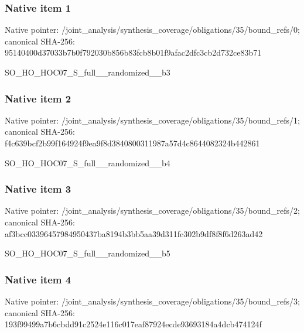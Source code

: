 \documentclass[10pt,a4paper]{article}
\begin{document}
\subsubsection{Native item 1}
Native pointer: /joint\_\allowbreak{}analysis/synthesis\_\allowbreak{}coverage/obligations/35/bound\_\allowbreak{}refs/0; canonical SHA-256: 95140400d37033b7b0f792030b856b83fcb8b01f9afac2dfc3cb2d732ce83b71

\begingroup\raggedright\sloppy SO\_\allowbreak{}HO\_\allowbreak{}HOC07\_\allowbreak{}S\_\allowbreak{}full\_\allowbreak{}\_\allowbreak{}randomized\_\allowbreak{}\_\allowbreak{}b3\par\endgroup

\subsubsection{Native item 2}
Native pointer: /joint\_\allowbreak{}analysis/synthesis\_\allowbreak{}coverage/obligations/35/bound\_\allowbreak{}refs/1; canonical SHA-256: f4c639bcf2b99f164924f9ea9f8d3840800311987a57d4c8644082324b442861

\begingroup\raggedright\sloppy SO\_\allowbreak{}HO\_\allowbreak{}HOC07\_\allowbreak{}S\_\allowbreak{}full\_\allowbreak{}\_\allowbreak{}randomized\_\allowbreak{}\_\allowbreak{}b4\par\endgroup

\subsubsection{Native item 3}
Native pointer: /joint\_\allowbreak{}analysis/synthesis\_\allowbreak{}coverage/obligations/35/bound\_\allowbreak{}refs/2; canonical SHA-256: af3bcc03396457984950437ba8194b3bb5aa39d311fc302b9df8f8f6d263ad42

\begingroup\raggedright\sloppy SO\_\allowbreak{}HO\_\allowbreak{}HOC07\_\allowbreak{}S\_\allowbreak{}full\_\allowbreak{}\_\allowbreak{}randomized\_\allowbreak{}\_\allowbreak{}b5\par\endgroup

\subsubsection{Native item 4}
Native pointer: /joint\_\allowbreak{}analysis/synthesis\_\allowbreak{}coverage/obligations/35/bound\_\allowbreak{}refs/3; canonical SHA-256: 193f99499a7b6cbdd91c2524e116c017eaf87924ecde93693184a4dcb474124f
\end{document}
